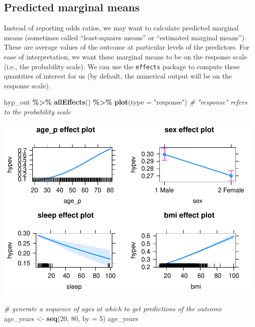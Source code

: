 \documentclass[
]{book}
\newenvironment{Shaded}{\begin{snugshade}}{\end{snugshade}}
\newcommand{\CommentTok}[1]{\textcolor[rgb]{0.56,0.35,0.01}{\textit{#1}}}
\newcommand{\DataTypeTok}[1]{\textcolor[rgb]{0.13,0.29,0.53}{#1}}
\newcommand{\DecValTok}[1]{\textcolor[rgb]{0.00,0.00,0.81}{#1}}
\newcommand{\KeywordTok}[1]{\textcolor[rgb]{0.13,0.29,0.53}{\textbf{#1}}}
\newcommand{\NormalTok}[1]{#1}
\newcommand{\OperatorTok}[1]{\textcolor[rgb]{0.81,0.36,0.00}{\textbf{#1}}}
\newcommand{\StringTok}[1]{\textcolor[rgb]{0.31,0.60,0.02}{#1}}
\begin{document}
\hypertarget{predicted-marginal-means}{%
\subsection{Predicted marginal means}\label{predicted-marginal-means}}

Instead of reporting odds ratios, we may want to calculate predicted marginal means (sometimes called ``least-squares means'' or ``estimated marginal means''). These are average values of the outcome at particular levels of the predictors. For ease of interpretation, we want these marginal means to be on the response scale (i.e., the probability scale). We can use the \texttt{effects} package to compute these quantities of interest for us (by default, the numerical output will be on the response scale).

\begin{Shaded}
\begin{Highlighting}[]
\NormalTok{  hyp\_out }\OperatorTok{\%\textgreater{}\%}\StringTok{ }
\StringTok{      }\KeywordTok{allEffects}\NormalTok{() }\OperatorTok{\%\textgreater{}\%}
\StringTok{      }\KeywordTok{plot}\NormalTok{(}\DataTypeTok{type =} \StringTok{"response"}\NormalTok{) }\CommentTok{\# "response" refers to the probability scale}
\end{Highlighting}
\end{Shaded}

\includegraphics{R/Rmodels/figures/unnamed-chunk-118-1.pdf}

\begin{Shaded}
\begin{Highlighting}[]
  \CommentTok{\# generate a sequence of ages at which to get predictions of the outcome}
\NormalTok{  age\_years \textless{}{-}}\StringTok{ }\KeywordTok{seq}\NormalTok{(}\DecValTok{20}\NormalTok{, }\DecValTok{80}\NormalTok{, }\DataTypeTok{by =} \DecValTok{5}\NormalTok{)}
\NormalTok{  age\_years}
\end{Highlighting}
\end{Shaded}
\end{document}
